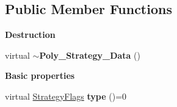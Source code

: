 \subsection*{Public Member Functions}
\begin{Indent}\textbf{ Destruction}\par
\begin{DoxyCompactItemize}
\item 
\mbox{\label{class_poly___strategy___data_acdbc88a35a960f6f2934947de32b1f20}} 
virtual {\bfseries $\sim$\+Poly\+\_\+\+Strategy\+\_\+\+Data} ()
\end{DoxyCompactItemize}
\end{Indent}
\begin{Indent}\textbf{ Basic properties}\par
\begin{DoxyCompactItemize}
\item 
\mbox{\label{class_poly___strategy___data_a305ffff282203eaccd7f1709634bc5d4}} 
virtual \hyperlink{group__strategygroup_ga0ee6c8e033547330e6b89929730007f4}{Strategy\+Flags} {\bfseries type} ()=0
\end{DoxyCompactItemize}
\end{Indent}
